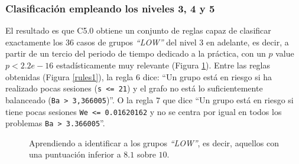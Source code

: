 \subsubsection{Clasificación empleando los niveles 3, 4 y 5}

El resultado es que C5.0 obtiene un conjunto de reglas capaz de clasificar exactamente los $36$ casos de grupos \emph{``LOW''} del nivel $3$ en adelante, es decir, a partir de un tercio del periodo de tiempo dedicado a la práctica, con un $p$ value $p < 2.2e-16$ estadísticamente muy relevante (Figura \ref{fig:cm1}). Entre las reglas obtenidas (Figura \ref{rules1}), la regla $6$ dice: ``Un grupo está en riesgo si ha realizado pocas sesiones (\texttt{s <= 21}) y el grafo no está lo suficientemente balanceado (\texttt{Ba > 3,366005})''. O la regla $7$ que dice ``Un grupo está en riesgo si tiene pocas sesiones \texttt{We <= 0.01620162} y no se centra por igual en todos los problemas \texttt{Ba > 3.366005}''. %

\begin{figure}[H]
\centering
{}
\caption{Aprendiendo a identificar a los grupos \emph{``LOW''}, es decir, aquellos con una puntuación inferior a $8.1$ sobre $10$.}
\label{fig:cm1}
\end{figure}

